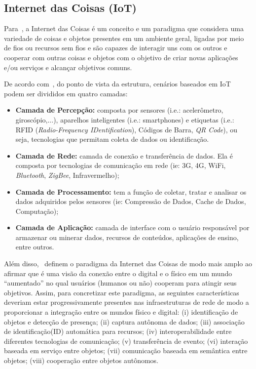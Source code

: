 \subsection{Internet das Coisas (IoT)}\label{section:iot}

Para~\cite{Vermesan:2013}, a Internet das Coisas é um conceito e um paradigma que considera uma variedade de coisas e objetos presentes em um ambiente geral, ligadas por meio de fios ou recursos sem fios e são capazes de interagir uns com os outros e cooperar com outras coisas e objetos com o objetivo de criar novas aplicações e/ou serviços e alcançar objetivos comuns.

De acordo com~\cite{Chang:2014}, do ponto de vista da estrutura, cenários baseados em IoT podem ser divididos em quatro camadas:

\begin{itemize}
	\item \textbf{Camada de Percepção:} composta por sensores (i.e.: acelerômetro, giroscópio,...), aparelhos inteligentes (i.e.: smartphones) e etiquetas (i.e.: RFID (\textit{Radio-Frequency IDentification}), Códigos de Barra, \textit{QR Code}), ou seja, tecnologias que permitam coleta de dados ou identificação.
	\item \textbf{Camada de Rede:} camada de conexão e transferência de dados. Ela é composta por tecnologias de comunicação em rede (ie: 3G, 4G, WiFi, \textit{Bluetooth}, \textit{ZigBee}, Infravermelho);
	\item \textbf{Camada de Processamento:} tem a função de coletar, tratar e analisar os dados adquiridos pelos sensores (ie: Compressão de Dados, Cache de Dados, Computação);
	\item \textbf{Camada de Aplicação:} camada de interface com o usuário responsável por armazenar ou minerar dados, recursos de conteúdos, aplicações de ensino, entre outros.
\end{itemize}

Além disso,~\cite{serbanati:2011} definem o paradigma da Internet das Coisas de modo mais amplo ao afirmar que é uma visão da conexão entre o digital e o físico em um mundo ``aumentado'' no qual usuários (humanos ou não) cooperam para atingir seus objetivos. Assim, para concretizar este paradigma, as seguintes características deveriam estar progressivamente presentes nas infraestruturas de rede de modo a proporcionar a integração entre os mundos físico e digital: (i) identificação de objetos e detecção de presença; (ii) captura autônoma de dados; (iii) associação de identificação(ID) automática para recursos; (iv) interoperabilidade entre diferentes tecnologias de comunicação; (v) transferência de evento; (vi) interação baseada em serviço entre objetos; (vii) comunicação baseada em semântica entre objetos; (viii) cooperação entre objetos autônomos.

